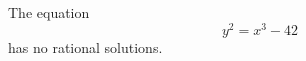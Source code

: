 \begin{proposition}
    The equation
\[
    y^2=x^3-42
\]
    has no rational solutions.
\end{proposition}

